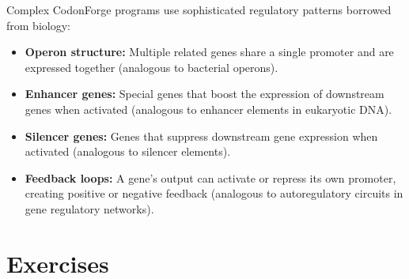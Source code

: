 Complex CodonForge programs use sophisticated regulatory patterns borrowed from biology:

\begin{itemize}[leftmargin=1.8em]
  \item \textbf{Operon structure:} Multiple related genes share a single promoter and are expressed together (analogous to bacterial operons).
  \item \textbf{Enhancer genes:} Special genes that boost the expression of downstream genes when activated (analogous to enhancer elements in eukaryotic DNA).
  \item \textbf{Silencer genes:} Genes that suppress downstream gene expression when activated (analogous to silencer elements).
  \item \textbf{Feedback loops:} A gene's output can activate or repress its own promoter, creating positive or negative feedback (analogous to autoregulatory circuits in gene regulatory networks).
\end{itemize}


\section{Exercises}
\label{sec:ch11-exercises}

